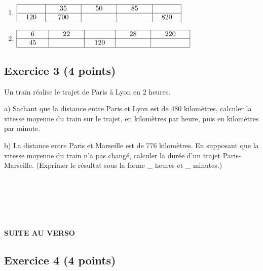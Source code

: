 \documentclass[14 pt]{extarticle}
\theoremstyle{plain}
\begin{document}
\begin{enumerate}
\item $\renewcommand{\arraystretch}{1}
\begin{array}{|c|c|c|c|c|}
\hline
\phantom{000} \phantom{000} & \phantom{000}35\phantom{000} & \phantom{000}50 \phantom{000}&  \phantom{000}85\phantom{000} & \phantom{000} \phantom{000} \\
\hline
120 & 700 &   & & 820 \\
\hline
\end{array}
\renewcommand{\arraystretch}{1}$

\item $\renewcommand{\arraystretch}{1}
\begin{array}{|c|c|c|c|c|}
\hline
\phantom{000}6\phantom{000} & \phantom{000}22\phantom{000} & \phantom{000} \ \phantom{000} & \phantom{000}28\phantom{000}& \phantom{000}220\phantom{000}   \\
\hline
45 &   & 120& &\\
\hline
\end{array}
\renewcommand{\arraystretch}{1}$
\end{enumerate}

\subsection*{Exercice 3 (4 points)}

Un train réalise le trajet de Paris à Lyon en $2$ heures. 

a) Sachant que la distance entre Paris et Lyon est de $480$ 
kilomètres, calculer la vitesse moyenne du train sur le trajet, en kilomètres par heure, puis en kilomètres par minute. 

b) La distance entre Paris et Marseille est de $776$ kilomètres. En 
supposant que la vitesse moyenne du train n'a pas changé, calculer la durée d'un trajet Paris-Marseille. (Exprimer le résultat sous la forme \_ heures et \_ minutes.)

\ 

\ 

\ 

{\Large{\begin{center} \textbf{SUITE AU VERSO} \end{center}}}

\newpage

\subsection*{Exercice 4 (4 points)}
\end{document}
